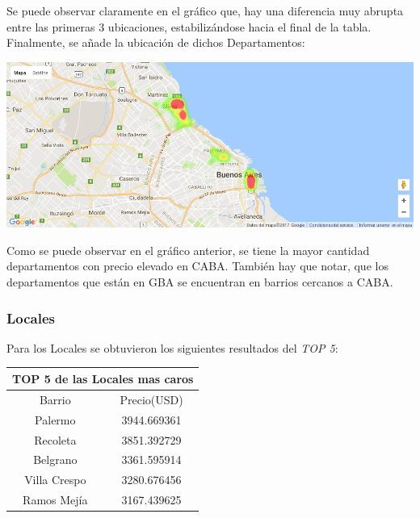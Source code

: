 \documentclass[a4paper, 10pt]{article}
\begin{document}
				Se puede observar claramente en el gráfico que, hay una diferencia muy abrupta entre las primeras 3 ubicaciones, estabilizándose hacia el final de la tabla.\\				
				Finalmente, se añade la ubicación de dichos Departamentos:
				
				\begin{center}
   		    				\includegraphics[width=\textwidth]{images/ubicDc}
				\end{center}	
				
				Como se puede observar en el gráfico anterior, se tiene la mayor cantidad departamentos con precio elevado en CABA. También hay que notar, que los departamentos que están en GBA se encuentran en barrios cercanos a CABA.
				
				\subsubsection{Locales}
				
					Para los Locales se obtuvieron los siguientes resultados del \emph{TOP 5}:
				
					\begin{center}
						\begin{tabular}{ |c|c| }
							\hline
							\multicolumn{2}{|c|}{TOP 5 de las Locales mas caros}\\
							\hline
							\hline
							Barrio & Precio(USD)\\
							\hline
							Palermo & 3944.669361 \\
							Recoleta & 3851.392729 \\
							Belgrano & 3361.595914 \\
							Villa Crespo & 3280.676456 \\
							Ramos Mejía & 3167.439625 \\
							\hline
						\end{tabular}
					\end{center}
				
\end{document}
